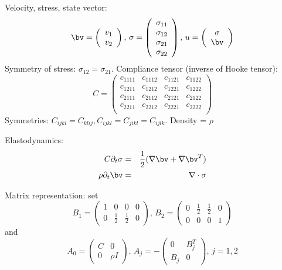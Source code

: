 Velocity, stress, state vector:
\[
  \bv = \left(
    \begin{array}{c}
      v_1 \\
      v_2
    \end{array}
  \right), \,
  \sigma = \left(
    \begin{array}{c}
      \sigma_{11} \\
      \sigma_{12} \\
      \sigma_{21} \\
      \sigma_{22}
    \end{array}
  \right), \, 
  u = \left(
    \begin{array}{c}
      \sigma\\
      \bv
    \end{array}
  \right)
\]
Symmetry of stress: $\sigma_{12}=\sigma_{21}$. Compliance tensor (inverse of Hooke tensor):
\[
  C =\left(
    \begin{array}{cccc}
      c_{1111} &  c_{1112} &  c_{1121} &  c_{1122} \\
      c_{1211} &  c_{1212} &  c_{1221} &  c_{1222} \\
      c_{2111} &  c_{2112} &  c_{2121} &  c_{2122} \\
      c_{2211} &  c_{2212} &  c_{2221} &  c_{2222} \\
    \end{array}
  \right)
\]
Symmetries: $C_{ijkl}=C_{klij}, C_{ijkl}=C_{jikl}=C_{ijlk}$. Density = $\rho$

Elastodynamics:
\begin{eqnarray}
  \label{eqn:const}
  C \partial_ t \sigma & = & \frac{1}{2}(\nabla \bv + \nabla \bv^T) \\
  \label{eqn:mombal}
  \rho \partial_t \bv & = & \nabla \cdot \sigma
\end{eqnarray}

Matrix representation: set
\[
  B_1=\left(
    \begin{array}{cccc}
      1 & 0 & 0 & 0 \\
      0 & \frac{1}{2} & \frac{1}{2} & 0
    \end{array}
  \right),\,
  B_2=\left(
    \begin{array}{cccc}
      0 & \frac{1}{2} & \frac{1}{2} & 0 \\
      0 & 0 & 0 & 1
    \end{array}
  \right)
\]
and
\[
  A_0 = \left(
    \begin{array}{cc}
      C & 0 \\
      0 & \rho I
    \end{array}
  \right), \,
  A_j = -\left(
    \begin{array}{cc}
      0 & B_j^T \\
      B_j & 0
    \end{array}
  \right), \, j=1,2
\]

